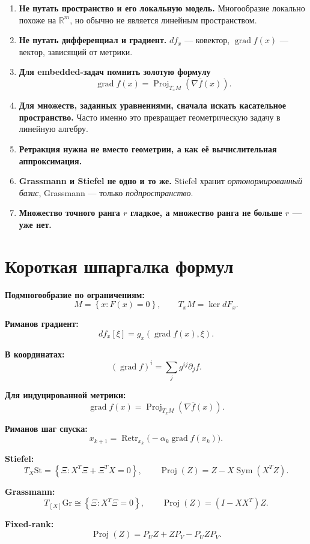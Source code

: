 \documentclass[12pt,a4paper]{article}
\theoremstyle{rudef}
\theoremstyle{ruplain}
\newcommand{\R}{\mathbb{R}}
\newcommand{\grad}{\operatorname{grad}}
\newcommand{\Sym}{\operatorname{Sym}}
\newcommand{\Proj}{\operatorname{Proj}}
\newcommand{\St}{\mathrm{St}}
\newcommand{\Gr}{\mathrm{Gr}}
\newcommand{\Retr}{\operatorname{Retr}}
\newcommand{\set}[1]{\left\{#1\right\}}
\begin{document}
\begin{enumerate}
  \item \textbf{Не путать пространство и его локальную модель.}
  Многообразие локально похоже на $\R^m$, но обычно не является линейным пространством.

  \item \textbf{Не путать дифференциал и градиент.}
  $df_x$ --- ковектор, $\grad f(x)$ --- вектор, зависящий от метрики.

  \item \textbf{Для embedded-задач помнить золотую формулу}
  \[
  \grad f(x)=\Proj_{T_xM}(\nabla \bar f(x)).
  \]

  \item \textbf{Для множеств, заданных уравнениями, сначала искать касательное пространство.}
  Часто именно это превращает геометрическую задачу в линейную алгебру.

  \item \textbf{Ретракция нужна не вместо геометрии, а как её вычислительная аппроксимация.}

  \item \textbf{Grassmann и Stiefel не одно и то же.}
  Stiefel хранит \emph{ортонормированный базис}, Grassmann --- только \emph{подпространство}.

  \item \textbf{Множество точного ранга $r$ гладкое, а множество ранга не больше $r$ --- уже нет.}
\end{enumerate}

\section{Короткая шпаргалка формул}

\begin{summarybox}
\textbf{Подмногообразие по ограничениям:}
\[
M=\set{x:F(x)=0},\qquad T_xM=\ker dF_x.
\]

\textbf{Риманов градиент:}
\[
df_x[\xi]=g_x(\grad f(x),\xi).
\]

\textbf{В координатах:}
\[
(\grad f)^i=\sum_j g^{ij}\partial_j f.
\]

\textbf{Для индуцированной метрики:}
\[
\grad f(x)=\Proj_{T_xM}(\nabla \bar f(x)).
\]

\textbf{Риманов шаг спуска:}
\[
x_{k+1}=\Retr_{x_k}\!\bigl(-\alpha_k\grad f(x_k)\bigr).
\]

\textbf{Stiefel:}
\[
T_X\St=\set{\Xi:X^T\Xi+\Xi^TX=0},
\qquad
\Proj(Z)=Z-X\Sym(X^TZ).
\]

\textbf{Grassmann:}
\[
T_{[X]}\Gr\cong\set{\Xi:X^T\Xi=0},
\qquad
\Proj(Z)=(I-XX^T)Z.
\]

\textbf{Fixed-rank:}
\[
\Proj(Z)=P_UZ+ZP_V-P_UZP_V.
\]
\end{summarybox}
\end{document}
